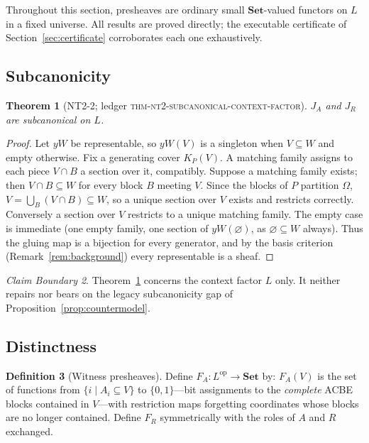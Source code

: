 \documentclass[11pt]{amsart}
\newtheorem{theorem}{Theorem}[section]
\theoremstyle{definition}
\newtheorem{definition}[theorem]{Definition}
\theoremstyle{remark}
\newtheorem{boundary}[theorem]{Claim Boundary}
\newcommand{\Set}{\mathbf{Set}}
\begin{document}
Throughout this section, presheaves are ordinary small $\Set$-valued functors on $L$ in a fixed universe. All results are proved directly; the executable certificate of Section~\ref{sec:certificate} corroborates each one exhaustively.

\subsection{Subcanonicity}

\begin{theorem}[NT2-2; \textnormal{ledger \textsc{thm-nt2-subcanonical-context-factor}}]\label{thm:nt2-2}
$J_A$ and $J_R$ are subcanonical on $L$.
\end{theorem}

\begin{proof}
Let $yW$ be representable, so $yW(V)$ is a singleton when $V\subseteq W$ and empty otherwise. Fix a generating cover $K_P(V)$. A matching family assigns to each piece $V\cap B$ a section over it, compatibly. Suppose a matching family exists; then $V\cap B\subseteq W$ for every block $B$ meeting $V$. Since the blocks of $P$ partition $\Omega$, $V=\bigcup_B (V\cap B)\subseteq W$, so a unique section over $V$ exists and restricts correctly. Conversely a section over $V$ restricts to a unique matching family. The empty case is immediate (one empty family, one section of $yW(\varnothing)$, as $\varnothing\subseteq W$ always). Thus the gluing map is a bijection for every generator, and by the basis criterion (Remark~\ref{rem:background}) every representable is a sheaf.
\end{proof}

\begin{boundary}
Theorem~\ref{thm:nt2-2} concerns the context factor $L$ only. It neither repairs nor bears on the legacy subcanonicity gap of Proposition~\ref{prop:countermodel}.
\end{boundary}

\subsection{Distinctness}

\begin{definition}[Witness presheaves]\label{def:witness}
Define $F_A:L^{\mathrm{op}}\to\Set$ by: $F_A(V)$ is the set of functions from $\{i \mid A_i\subseteq V\}$ to $\{0,1\}$---bit assignments to the \emph{complete} ACBE blocks contained in $V$---with restriction maps forgetting coordinates whose blocks are no longer contained. Define $F_R$ symmetrically with the roles of $A$ and $R$ exchanged.
\end{definition}
\end{document}
